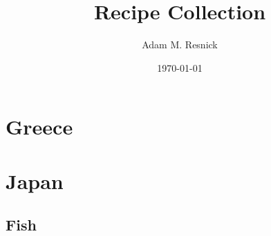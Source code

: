 \documentclass[11pt]{report}
\title{\bf{Recipe Collection}}
\author{Adam M. Resnick}
\date{\today}
\DeclareRobustCommand{\textfar}{\ensuremath{^{\circ}\mathrm{F}}}
\begin{document}
\maketitle

\tableofcontents

\begin{comment}
\begin{recipe}
[%
    preparationtime = {\unit[30]{min}},
    bakingtime={\unit[1]{h}},
    bakingtemperature={\protect\bakingtemperature{
        fanoven=\unit[230]{\textfar},
        topbottomheat=\unit[195]{°C},
        topheat=\unit[195]{°C},
        gasstove=Level 2}},
    portion = {\portion{5-6}},
    calory={\unit[3]{kJ}},
    source = {Somebody you used know}
]
{Test Recipe}

    \introduction{
        \blindtext
    }

    \ingredients{
        2 bar & Dark Chocolate (above \unit[70]{\%})\\
        3 & Eggs\\
        \unit[200]{ml} & Cream\\
        40 g & Sugar\\
        50 g & Butter
    }

    \preparation{
        \step \blindtext
        \step \blindtext
        \step \blindtext
    }

    \suggestion[Headline]{
        \blindtext
    }

    \suggestion{
        \blindtext
    }

    \hint{
        Enjoy typesetting recipes with {\textbf{\Large\LaTeX}} and {\textbf{\Large xcookybooky!}}
    }

\end{recipe}
\end{comment}

\chapter {Greece}

\chapter{Japan}
\section{Fish}
\end{document}
